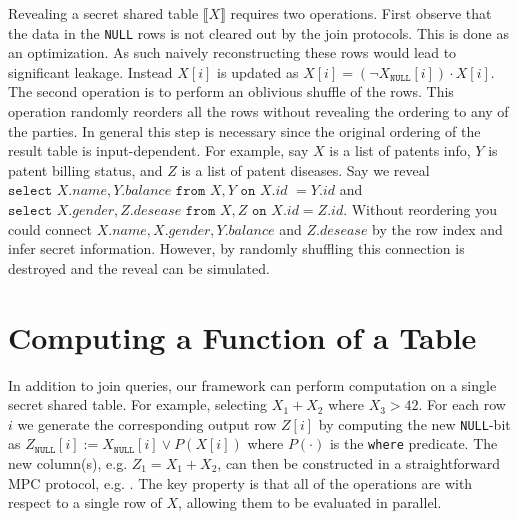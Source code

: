 \documentclass[11pt,letterpaper]{article}
\newcommand{\share}[1]{\ensuremath{\llbracket #1\rrbracket}\xspace}
\newcommand{\Null}{\texttt{NULL}\xspace}
\newcommand{\XNull}{\ensuremath{X_\Null}\xspace}
\newcommand{\ZNull}{\ensuremath{Z_\Null}\xspace}
\begin{document}
Revealing a secret shared table $\share{X}$ requires two operations. First observe that the data in the \texttt{NULL} rows is not cleared out by the join protocols. This is done as an optimization. As such naively reconstructing these rows would lead to significant leakage. Instead $X[i]$  is updated as $X[i]=(\neg\XNull[i])\cdot X[i]$. The second operation is to perform an oblivious shuffle of the rows. This operation randomly reorders all the rows without revealing the ordering to any of the parties. In general this step is necessary since the original ordering of the result table is input-dependent. For example, say $X$ is a list of patents info, $Y$ is patent billing status, and $Z$ is a list of patent diseases. Say we reveal $\texttt{select } X.name, Y.balance \texttt{ from } X,Y \texttt{ on } X.id$ $=Y.id$ and $\texttt{select } X.gender, Z.desease \texttt{ from } X,Z \texttt{ on } \allowbreak X.id=Z.id$. Without reordering you could connect $X.name, X.gender, Y.balance$ and $Z.desease$ by the row index and infer secret information. However, by randomly shuffling this connection is destroyed and the reveal can be simulated.




\section{Computing a Function of a Table}\label{sec:card}

In addition to join queries, our framework can perform computation on a single secret shared table. For example, selecting $X_1+X_2$  where $X_3>42$. For each row $i$ we generate the corresponding output row $Z[i]$ by computing the new \texttt{NULL}-bit as $\ZNull[i] := \XNull[i] \vee P(X[i])$ where $P(\cdot)$ is the \texttt{where} predicate. The new column(s), e.g. $Z_1=X_1+X_2$, can then be constructed in a straightforward MPC protocol, e.g. \cite{aby3,highthroughput}. The key property is that all of the operations are with respect to a single row of $X$, allowing them to be evaluated in parallel. 
\end{document}
